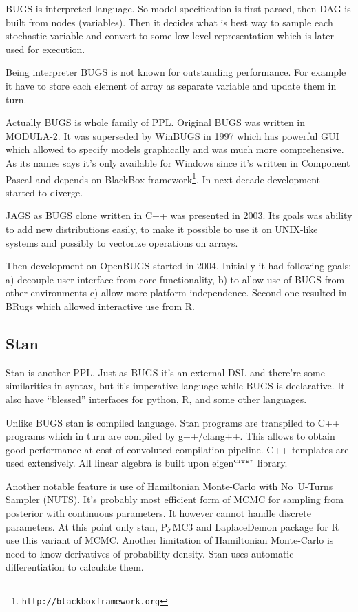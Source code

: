 \documentclass[a4paper]{article}
\newcommand{\citationneeded}{\textcolor{red}{$^{\mbox{\tiny{CITE?}}}$}}
\begin{document}
BUGS is interpreted language. So model specification is first parsed, then DAG
is built from nodes (variables). Then it decides what is best way to sample each
stochastic variable and convert to some low-level representation which is later
used for execution.

Being interpreter BUGS is not known for outstanding performance. For example
it have to store each element of array as separate variable and update them in
turn.

Actually BUGS is whole family of PPL. Original BUGS was written in MODULA-2. It
was superseded by WinBUGS in 1997 which has powerful GUI which allowed to
specify models graphically and was much more comprehensive. As its names says
it's only available for Windows since it's written in Component Pascal and
depends on BlackBox
framework\footnote{\texttt{http://blackboxframework.org}}. In next decade
development started to diverge.

JAGS\cite{plummer2003jags} as BUGS clone written in C++ was presented in
2003. Its goals was ability to add new distributions easily, to make it possible
to use it on UNIX-like systems and possibly to vectorize operations on arrays.

Then development on OpenBUGS started in 2004. Initially it had following goals:
a) decouple user interface from core functionality, b) to allow use of BUGS from
other environments c) allow more platform independence. Second one resulted in
BRugs which allowed interactive use from R.


\subsection{Stan}

Stan\cite{carpenter2016stan}\cite{t2015stan} is another PPL. Just as BUGS it's
an external DSL and there're some similarities in syntax, but it's imperative
language while BUGS is declarative. It also have ``blessed'' interfaces for
python, R, and some other languages.

Unlike BUGS stan is compiled language. Stan programs are transpiled to C++
programs which in turn are compiled by g++/clang++. This allows to obtain good
performance at cost of convoluted compilation pipeline. C++ templates are used
extensively. All linear algebra is built upon eigen\citationneeded
library.

Another notable feature is use of Hamiltonian Monte-Carlo\cite{duane1987hybrid}
with No~U-Turns Sampler (NUTS)\cite{hoffman2014NUTS}. It's probably most
efficient form of MCMC for sampling from posterior with continuous
parameters. It however cannot handle discrete parameters. At this point only
stan, PyMC3 and LaplaceDemon package for R use this variant of MCMC. Another
limitation of Hamiltonian Monte-Carlo is need to know derivatives of probability
density. Stan uses automatic differentiation to calculate them.
\end{document}
